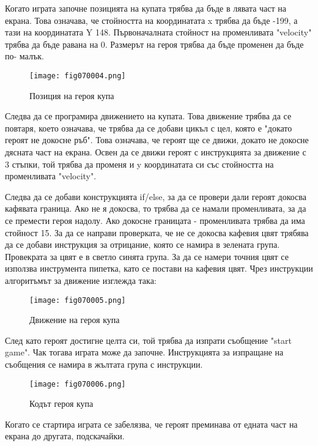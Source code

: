 Когато играта започне позицията на купата трябва да бъде в лявата част на екрана. Това означава, че стойността на координатата x трябва да бъде -199, а тази на координатата Y 148. Първоначалната стойност на променливата "velocity" трябва да бъде равана на 0. Размерът на героя трябва да бъде променен да бъде по- малък.

\begin{figure}[H]
  \centering
  \texttt{[image: fig070004.png]}
  \caption{Позиция на героя купа}
\label{fig070004}
\end{figure}

Следва да се програмира движението на купата. Това движение трябва да се повтаря, което означава, че трябва да се добави цикъл с цел, която е "докато героят не докосне ръб". Това означава, че героят ще се движи, докато не докосне дясната част на екрана. Освен да се движи героят с инструкцията за движение с 3 стъпки, той трябва да променя и y координатата си със стойността на променливата "velocity".

Следва да се добави конструкцията if/else, за да се провери дали героят докосва кафявата граница. Ако не я докосва, то трябва да се намали променливата, за да се премести героя надолу. Ако докосне границата - променливата трябва да има стойност 15. За да се направи проверката, че не се докосва кафевия цвят трябява да се добави инструкция за отрицание, която се намира в зелената група. Провекрата за цвят е в светло синята група. За да се намери точния цвят се използва инструмента пипетка, като се постави на кафевия цвят. Чрез инструкции алгоритъмът за движение изглежда така:

\begin{figure}[H]
  \centering
  \texttt{[image: fig070005.png]}
  \caption{Движение на героя купа}
\label{fig070005}
\end{figure}

След като героят достигне целта си, той трябва да изпрати съобщение "start game". Чак тогава играта може да започне. Инструкцията за изпращане на съобщения се намира в жълтата група с инструкции.

\begin{figure}[H]
  \centering
  \texttt{[image: fig070006.png]}
  \caption{Кодът героя купа}
\label{fig070006}
\end{figure}

Когато се стартира играта се забелязва, че героят преминава от едната част на екрана до другата, подскачайки.

